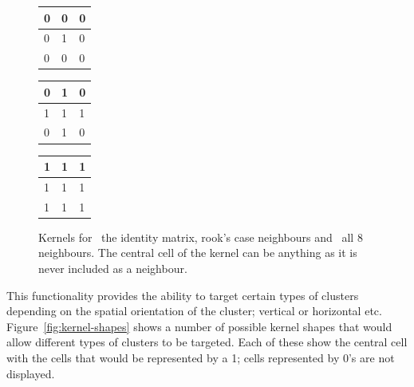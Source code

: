 \begin{figure}[tbh]
	\centering
	\begin{subtable}[b]{0.2\textwidth}
	\centering
		\begin{tabular}{|l|l|l|}
			\hline
			0 & 0 & 0 \\
			\hline
			0 & \cellcolor{lred}1 & 0 \\
			\hline
			0 & 0 & 0 \\
			\hline
		\end{tabular}
		\caption{}\label{fig:kernel-identity}
	\end{subtable}%
	\quad
	\begin{subtable}[b]{0.2\textwidth}
	\centering
		\begin{tabular}{|l|l|l|}
			\hline
			0 & 1 & 0 \\
			\hline
			1 & \cellcolor{lred}1 & 1 \\
			\hline
			0 & 1 & 0 \\
			\hline
		\end{tabular}
		\caption{}\label{fig:kernel-image-rooks}
	\end{subtable}%
	\quad
	\begin{subtable}[b]{0.2\textwidth}
	\centering
		\begin{tabular}{|l|l|l|}
			\hline
			1 & 1 & 1 \\
			\hline
			1 & \cellcolor{lred}1 & 1 \\
			\hline
			1 & 1 & 1 \\
			\hline
		\end{tabular}
		\caption{}\label{fig:kernel-image-all8}
	\end{subtable}

	\caption[Kernels for the identity matrix, rook's case and all 8
		neighbours.]{Kernels for~ the identity
		matrix, rook's case neighbours
		and~ all 8 neighbours. The central cell of the
		kernel can be anything as it is never included as a neighbour.}\label{fig:kernel-neighbours}
\end{figure}

This functionality provides the ability to target certain types of clusters
depending on the spatial orientation of the cluster; vertical or horizontal
etc. Figure~\ref{fig:kernel-shapes} shows a number of possible kernel shapes
that would allow different types of clusters to be targeted. Each of these show
the central cell with the cells that would be represented by a 1; cells
represented by 0's are not displayed.

